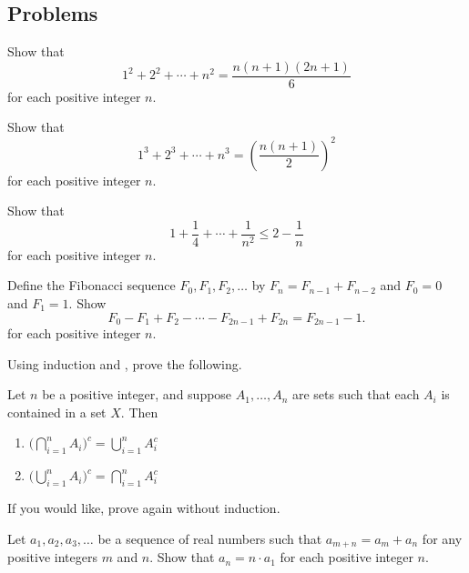 \documentclass[../notes.tex]{subfiles}
\begin{document}
\subsection{Problems}
\begin{homework}
    Show that
    \[1^2+2^2+\cdots +n^2=\frac{n(n+1)(2n+1)}{6}\]
    for each positive integer $n$.
\end{homework}
\begin{homework}
    Show that
    \[1^3+2^3+\cdots+n^3=\left(\frac{n(n+1)}2\right)^2\]
    for each positive integer $n$.
\end{homework}
\begin{homework} \label{hw:basel}
    Show that $$1+\frac{1}{4}+\cdots +\frac{1}{n^2} \le 2-\frac{1}{n}$$ for each positive integer $n$.
\end{homework}
\begin{homework} \label{hw:fib-diff}
    Define the Fibonacci sequence $F_0,F_1,F_2,\ldots$ by $F_n=F_{n-1}+F_{n-2}$ and $F_0=0$ and $F_1=1$. Show
    \[F_0-F_1+F_2-\cdots-F_{2n-1}+F_{2n}=F_{2n-1}-1.\]
    for each positive integer $n$.
\end{homework}
\begin{homework}
    Using induction and , prove the following.
    \begin{theorem} \label{thm:general-de-morgan}
        Let $n$ be a positive integer, and suppose $A_1, \dots, A_n$ are sets such that each $A_i$ is contained in a set $X$. Then
        \begin{enumerate}[label=(\alph*)]
            \item $\Big(\bigcap_{i = 1}^nA_i\Big)^c = \bigcup_{i = 1}^n A_i^c$
            \item $\Big(\bigcup_{i = 1}^nA_i\Big)^c = \bigcap_{i = 1}^n A_i^c$
        \end{enumerate}
    \end{theorem}
    If you would like, prove  again without induction.
\end{homework}
\begin{homework}
    Let $a_1,a_2,a_3,\ldots$ be a sequence of real numbers such that $a_{m+n}=a_m+a_n$ for any positive integers $m$ and $n$. Show that $a_n=n\cdot a_1$ for each positive integer $n$.
\end{homework}
\end{document}
